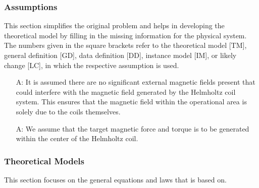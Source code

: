 \documentclass[12pt]{article}
\newcounter{assumpnum} %
\begin{document}
\subsubsection{Assumptions} \label{sec_assumpt}
This section simplifies the original problem and helps in developing the
theoretical model by filling in the missing information for the physical system.
The numbers given in the square brackets refer to the theoretical model [TM],
general definition [GD], data definition [DD], instance model [IM], or likely
change [LC], in which the respective assumption is used.

\begin{itemize}

\item[A\refstepcounter{assumpnum}\theassumpnum \label{A_noExtField}:]
It is assumed there are no significant external magnetic fields present that could interfere with the magnetic field generated by the Helmholtz coil system. This ensures that the magnetic field within the operational area is solely due to the coils themselves.

\item[A\refstepcounter{assumpnum}\theassumpnum \label{A_generateWithinCenter}:]
We assume that the target magnetic force and torque is to be generated within the center of the Helmholtz coil.

\end{itemize}

\subsubsection{Theoretical Models}\label{sec_theoretical}
This section focuses on the general equations and laws that \progname{} is based
on.  
\end{document}
